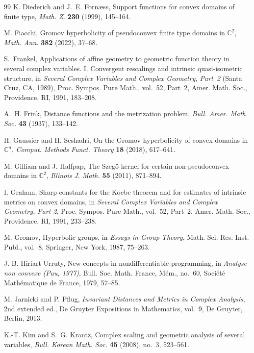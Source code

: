 \documentclass[11pt]{article}
\theoremstyle{definition}
\newcommand{\C}{\mathbb{C}}
\begin{document}
\begin{thebibliography}{99}
	K. Diederich and J.~E. Forn{\ae}ss,
	Support functions for convex domains of finite type,
	\emph{Math. Z.} \textbf{230} (1999), 145--164.
	
	M. Fiacchi,
	Gromov hyperbolicity of pseudoconvex finite type domains in
	\(\C^2\),
	\emph{Math. Ann.} \textbf{382} (2022), 37--68.
	
	S.~Frankel,
	Applications of affine geometry to geometric function theory in several
	complex variables. I. Convergent rescalings and intrinsic
	quasi-isometric structure,
	in \emph{Several Complex Variables and Complex Geometry, Part~2}
	(Santa Cruz, CA, 1989),
	Proc. Sympos. Pure Math., vol.~52, Part~2,
	Amer. Math. Soc., Providence, RI, 1991, 183--208.

	A.~H. Frink,
	Distance functions and the metrization problem,
	\emph{Bull. Amer. Math. Soc.} \textbf{43} (1937), 133--142.
	
	H. Gaussier and H. Seshadri,
	On the Gromov hyperbolicity of convex domains in \(\C^n\),
	\emph{Comput. Methods Funct. Theory} \textbf{18} (2018), 617--641.
	
	M. Gilliam and J. Halfpap,
	The Szeg\"o kernel for certain non-pseudoconvex domains in \(\C^2\),
	\emph{Illinois J. Math.} \textbf{55} (2011), 871--894.
	
	I. Graham,
	Sharp constants for the Koebe theorem and for estimates of intrinsic
	metrics on convex domains,
	in \emph{Several Complex Variables and Complex Geometry, Part 2},
	Proc. Sympos. Pure Math., vol.~52, Part~2,
	Amer. Math. Soc., Providence, RI, 1991, 233--238.
	
	M. Gromov,
	Hyperbolic groups,
	in \emph{Essays in Group Theory},
	Math. Sci. Res. Inst. Publ., vol.~8,
	Springer, New York, 1987, 75--263.
	
	J.-B. Hiriart-Urruty,
	New concepts in nondifferentiable programming,
	in \emph{Analyse non convexe (Pau, 1977)},
	Bull. Soc. Math. France, M\'em., no.~60,
	Soci\'et\'e Math\'ematique de France, 1979, 57--85.
	
	M. Jarnicki and P. Pflug,
	\emph{Invariant Distances and Metrics in Complex Analysis},
	2nd extended ed.,
	De Gruyter Expositions in Mathematics, vol.~9,
	De Gruyter, Berlin, 2013.
	
	K.-T. Kim and S.~G. Krantz,
	Complex scaling and geometric analysis of several variables,
	\emph{Bull. Korean Math. Soc.} \textbf{45} (2008), no.~3,
	523--561.
	

\end{thebibliography}
\end{document}
